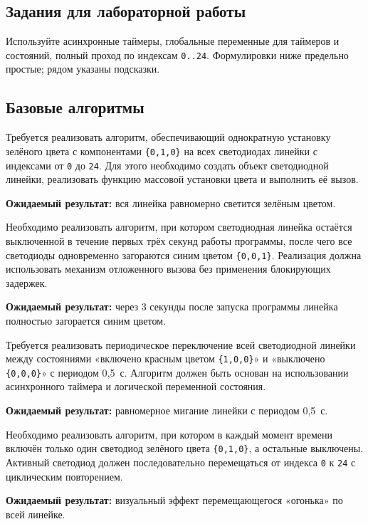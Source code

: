 \subsection{Задания для лабораторной работы}
Используйте асинхронные таймеры, глобальные переменные для таймеров и состояний, полный проход по индексам \verb|0..24|. Формулировки ниже предельно простые; рядом указаны подсказки.
\subsection{Базовые алгоритмы}

\begin{taskbox}
Требуется реализовать алгоритм, обеспечивающий однократную установку зелёного цвета с компонентами \verb|{0,1,0}| на всех светодиодах линейки с индексами от \verb|0| до \verb|24|. Для этого необходимо создать объект светодиодной линейки, реализовать функцию массовой установки цвета и выполнить её вызов.

\textbf{Ожидаемый результат:} вся линейка равномерно светится зелёным цветом.
\end{taskbox}

\begin{taskbox}
Необходимо реализовать алгоритм, при котором светодиодная линейка остаётся выключенной в течение первых трёх секунд работы программы, после чего все светодиоды одновременно загораются синим цветом \verb|{0,0,1}|. Реализация должна использовать механизм отложенного вызова без применения блокирующих задержек.

\textbf{Ожидаемый результат:} через 3 секунды после запуска программы линейка полностью загорается синим цветом.
\end{taskbox}

\begin{taskbox}
Требуется реализовать периодическое переключение всей светодиодной линейки между состояниями «включено красным цветом \verb|{1,0,0}|» и «выключено \verb|{0,0,0}|» с периодом 0{,}5~с. Алгоритм должен быть основан на использовании асинхронного таймера и логической переменной состояния.

\textbf{Ожидаемый результат:} равномерное мигание линейки с периодом 0{,}5~с.
\end{taskbox}

\begin{taskbox}
Необходимо реализовать алгоритм, при котором в каждый момент времени включён только один светодиод зелёного цвета \verb|{0,1,0}|, а остальные выключены. Активный светодиод должен последовательно перемещаться от индекса \verb|0| к \verb|24| с циклическим повторением.

\textbf{Ожидаемый результат:} визуальный эффект перемещающегося «огонька» по всей линейке.
\end{taskbox}

